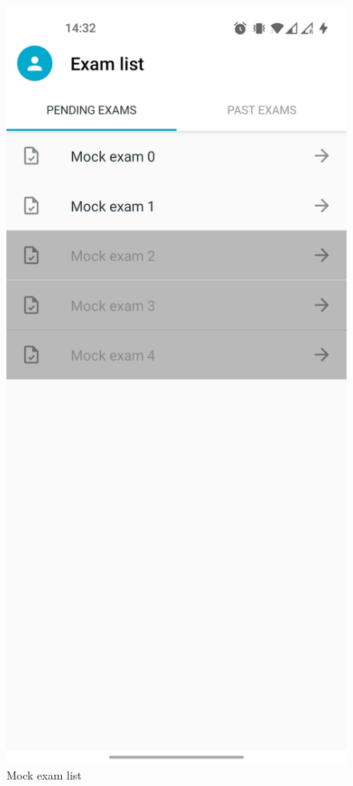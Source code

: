\begin{minipage}{.5\textwidth}
\begin{figure}[H]
    \centering
    \includegraphics[width=\textwidth]{appendix/imgs/app-exam-list.jpg}
    \caption{Mock exam list}
    \label{fig:app-exam-list}
\end{figure}
\end{minipage}

